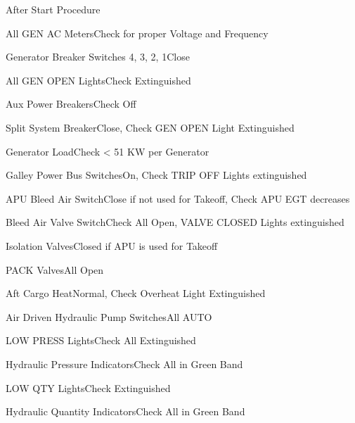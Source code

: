\documentclass[sim-use, blue_items]{checklist}
\begin{document}
\begin{checklist}{After Start Procedure}
	 {
		\item{All GEN AC Meters}{Check for proper Voltage and Frequency}
		\item{Generator Breaker Switches 4, 3, 2, 1}{Close}
		\item{All GEN OPEN Lights}{Check Extinguished}
		\item{Aux Power Breakers}{Check Off}
		\item{Split System Breaker}{Close, Check GEN OPEN Light Extinguished}
		\item{Generator Load}{Check < 51 KW per Generator}
	}
	\item{Galley Power Bus Switches}{On, Check TRIP OFF Lights extinguished}
	\item{APU Bleed Air Switch}{Close if not used for Takeoff, Check APU EGT decreases}
	\item{Bleed Air Valve Switch}{Check All Open, VALVE CLOSED Lights extinguished}
	\item{Isolation Valves}{Closed if APU is used for Takeoff}
	\item{PACK Valves}{All Open}
	\item{Aft Cargo Heat}{Normal, Check Overheat Light Extinguished}
	 {
		\item{Air Driven Hydraulic Pump Switches}{All AUTO}
		\item{LOW PRESS Lights}{Check All Extinguished}
		\item{Hydraulic Pressure Indicators}{Check All in Green Band}
		\item{LOW QTY Lights}{Check Extinguished}
		\item{Hydraulic Quantity Indicators}{Check All in Green Band}
	}
\end{checklist}
\end{document}
